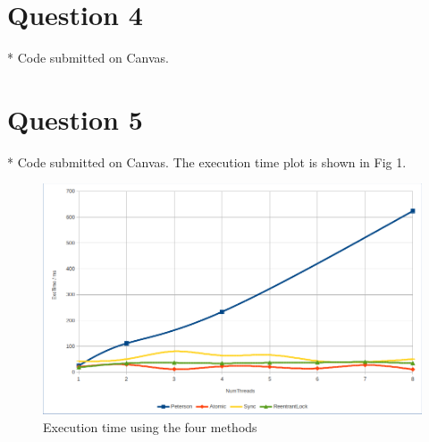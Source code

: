 \documentclass[12pt]{article}
\begin{document}
\section*{Question 4} 
* Code submitted on Canvas. 

\section*{Question 5}  
* Code submitted on Canvas. The execution time plot is shown in Fig 1. 
\begin{figure}[h] 
	 \includegraphics[width=\linewidth]{plot.png}
	 \caption{Execution time using the four methods}
\end{figure} 
\end{document}
